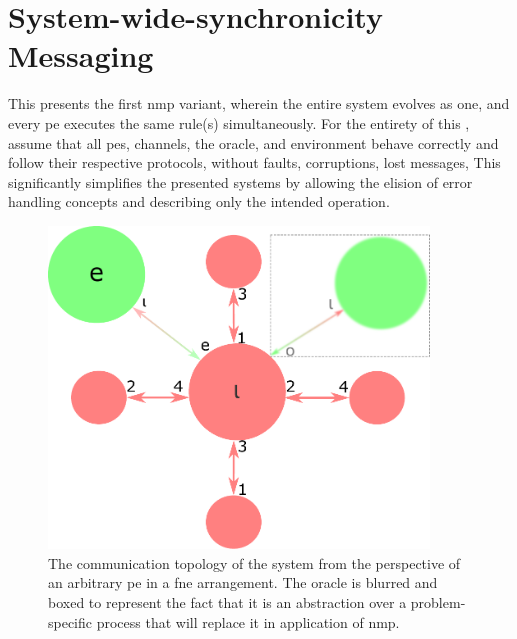 \section{\label{sec:nmp:systemwide}System-wide-synchronicity Messaging}

\cpresetrulenumber

This  presents the first \gls{nmp} variant, wherein the entire system evolves as one, and every \gls{pe} executes the same rule(s) simultaneously.  For the entirety of this , assume that all \glspl{pe}, channels, the oracle, and environment behave correctly and follow their respective protocols, without faults, corruptions, lost messages, \etc{}  This significantly simplifies the presented systems by allowing the elision of error handling concepts and describing only the intended operation.

\begin{figure}
    \centering
    \includegraphics[width=0.9\textwidth]{chapters/nmp/images/iota_proxels_environment_oracle_v6.pdf}
    \caption[The communication topology of a  system from the perspective of an arbitrary  in a \gls{fne} arrangement]{The communication topology of the system from the perspective of an arbitrary \gls{pe} in a \gls{fne} arrangement.  The oracle is blurred and boxed to represent the fact that it is an abstraction over a problem-specific process that will replace it in application of \gls{nmp}.}
    \label{fig:nmp:iota_proxels_environment_oracle}
\end{figure}

